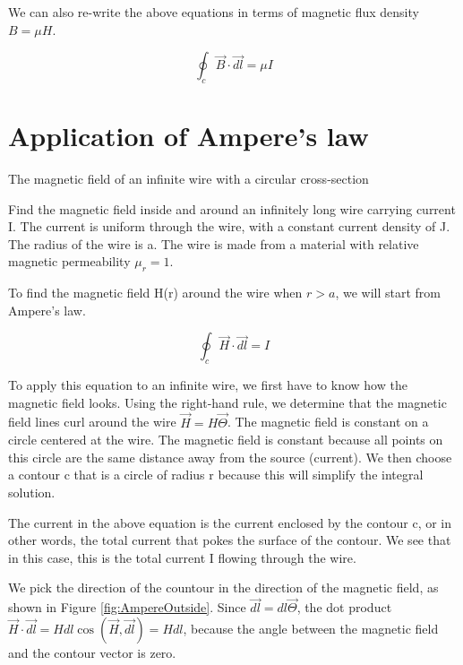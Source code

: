 \documentclass{ximera}
\begin{document}
We can also re-write the above equations in terms of magnetic flux density $B=\mu H$.


\begin{equation}
\oint_c \vec{B} \cdot \vec{dl} = \mu I
\end{equation}

\section{Application of Ampere's law}

\begin{example}
The magnetic field of an infinite wire with a circular cross-section

Find the magnetic field inside and around an infinitely long wire carrying current I. The current is uniform through the wire, with a constant current density of J. The radius of the wire is a. The wire is made from a material with relative magnetic permeability $\mu_r=1$. 
 
\begin{explanation}


To find the magnetic field H(r) around the wire when $r>a$, we will start from Ampere's law.


\begin{equation}
\oint_c \vec{H} \cdot \vec{dl} = I
\end{equation}

To apply this equation to an infinite wire, we first have to know how the magnetic field looks. Using the right-hand rule, we determine that the magnetic field lines curl around the wire $\vec{H}=H \vec{\Theta}$. The magnetic field is constant on a circle centered at the wire. The magnetic field is constant because all points on this circle are the same distance away from the source (current). We then choose a contour c that is a circle of radius r because this will simplify the integral solution. 

The current in the above equation is the current enclosed by the contour c, or in other words, the total current that pokes the surface of the contour. We see that in this case, this is the total current I flowing through the wire.

We pick the direction of the countour in the direction of the magnetic field, as shown in Figure \ref{fig:AmpereOutside}. Since $\vec{dl}=dl \vec{\Theta}$, the dot product $ \vec{H} \cdot \vec{dl} = H dl \cos(\vec{H},\vec{dl})=H dl$, because the  angle between the magnetic field and the contour vector is zero.


\end{explanation}
\end{example}
\end{document}
